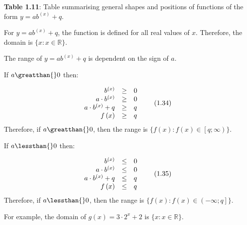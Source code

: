 \begin{center}{\small\bfseries Table 1.11}: Table summarising general shapes and positions of functions of the form $y=a{b}^{\left(x\right)}+q$.\end{center}
\par
{}
\label{m39348*uid187}
\nopagebreak
\label{m39348*id250625}For $y=a{b}^{\left(x\right)}+q$, the function is defined for all real values of $x$. Therefore, the domain is $\{x:x\in \mathbb{R}\}$.\par 
\label{m39348*id250696}The range of $y=a{b}^{\left(x\right)}+q$ is dependent on the sign of $a$.\par 
\label{m39348*id250742}If $a\greatthan{}0$ then:\par 
\label{m39348*id250762}\nopagebreak\noindent{}
\begin{equation}
\begin{array}{ccc}\hfill {b}^{\left(x\right)}& \ge & 0\hfill \\ \hfill a\ensuremath{\cdot}{b}^{\left(x\right)}& \ge & 0\hfill \\ \hfill a\ensuremath{\cdot}{b}^{\left(x\right)}+q& \ge & q\hfill \\ \hfill f\left(x\right)& \ge & q\hfill \end{array}\tag{1.34}
\end{equation}
\label{m39348*id250891}Therefore, if $a\greatthan{}0$, then the range is $\{f\left(x\right):f\left(x\right)\in \left[q;\infty \right)\}$.\par 
\label{m39348*id250956}If $a\lessthan{}0$ then:\par 
\label{m39348*id250976}\nopagebreak\noindent{}
\begin{equation}
\begin{array}{ccc}\hfill {b}^{\left(x\right)}& \le & 0\hfill \\ \hfill a\ensuremath{\cdot}{b}^{\left(x\right)}& \le & 0\hfill \\ \hfill a\ensuremath{\cdot}{b}^{\left(x\right)}+q& \le & q\hfill \\ \hfill f\left(x\right)& \le & q\hfill \end{array}\tag{1.35}
\end{equation}
\label{m39348*id251104}Therefore, if $a\lessthan{}0$, then the range is $\{f\left(x\right):f\left(x\right)\in \left(-\infty ;q\right]\}$.\par 
\label{m39348*id251171}For example, the domain of $g\left(x\right)=3\ensuremath{\cdot}{2}^{x}+2$ is $\{x:x\in \mathbb{R}\}$.
